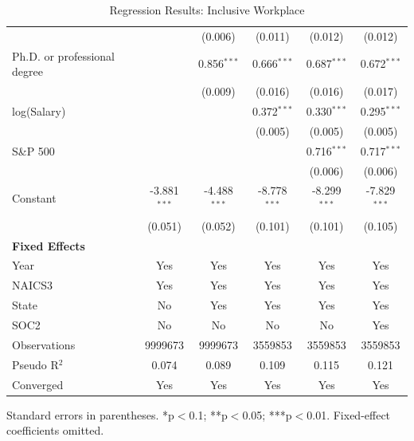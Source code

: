 \begin{table}[!htbp]
\begin{tabular}{lccccc}
 &  & (0.006) & (0.011) & (0.012) & (0.012) \\
Ph.D. or professional degree &  & 0.856$^{***}$ & 0.666$^{***}$ & 0.687$^{***}$ & 0.672$^{***}$ \\
 &  & (0.009) & (0.016) & (0.016) & (0.017) \\
log(Salary) &  &  & 0.372$^{***}$ & 0.330$^{***}$ & 0.295$^{***}$ \\
 &  &  & (0.005) & (0.005) & (0.005) \\
S\&P 500 &  &  &  & 0.716$^{***}$ & 0.717$^{***}$ \\
 &  &  &  & (0.006) & (0.006) \\
Constant & -3.881$^{***}$ & -4.488$^{***}$ & -8.778$^{***}$ & -8.299$^{***}$ & -7.829$^{***}$ \\
 & (0.051) & (0.052) & (0.101) & (0.101) & (0.105) \\
\midrule
\textbf{Fixed Effects} &  &  &  &  &  \\
Year & Yes & Yes & Yes & Yes & Yes \\
NAICS3 & Yes & Yes & Yes & Yes & Yes \\
State & No & Yes & Yes & Yes & Yes \\
SOC2 & No & No & No & No & Yes \\
Observations & 9999673 & 9999673 & 3559853 & 3559853 & 3559853 \\
Pseudo R$^2$ & 0.074 & 0.089 & 0.109 & 0.115 & 0.121 \\
Converged & Yes & Yes & Yes & Yes & Yes \\
\bottomrule
\end{tabular}
\caption{Regression Results: Inclusive Workplace}
\par\smallskip\scriptsize Standard errors in parentheses. *p$<$0.1; **p$<$0.05; ***p$<$0.01. Fixed-effect coefficients omitted.
\end{table}